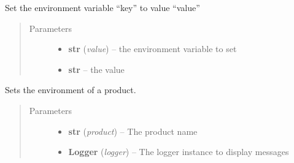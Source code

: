 \documentclass[a4paper,10pt,english]{sphinxmanual}
\begin{document}
\begin{fulllineitems}
\begin{fulllineitems}
\end{fulllineitems}


\begin{fulllineitems}
\label{commands/apidoc/src:src.environment.SalomeEnviron.set}
Set the environment variable ``key'' to value ``value''
\begin{quote}\begin{description}
\item[{Parameters}] \leavevmode\begin{itemize}
\item {} 
\textbf{str} (\emph{value}) -- the environment variable to set

\item {} 
\textbf{str} -- the value

\end{itemize}

\end{description}\end{quote}

\end{fulllineitems}


\begin{fulllineitems}
\label{commands/apidoc/src:src.environment.SalomeEnviron.set_a_product}
Sets the environment of a product.
\begin{quote}\begin{description}
\item[{Parameters}] \leavevmode\begin{itemize}
\item {} 
\textbf{str} (\emph{product}) -- The product name

\item {} 
\textbf{Logger} (\emph{logger}) -- The logger instance to display messages

\end{itemize}

\end{description}\end{quote}

\end{fulllineitems}



\end{fulllineitems}
\end{document}
